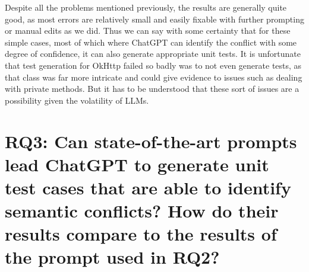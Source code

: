 Despite all the problems mentioned previously, the results are generally quite good, as most errors are relatively small and easily fixable with further prompting or manual edits as we did.
Thus we can say with some certainty that for these simple cases, most of which where ChatGPT can identify the conflict with some degree of confidence, it can also generate appropriate unit tests.
It is unfortunate that test generation for OkHttp failed so badly was to not even generate tests, as that class was far more intricate and could give evidence to issues such as dealing with
private methods. But it has to be understood that these sort of issues are a possibility given the volatility of LLMs.



\section[Research Question 3: Existing prompts]{RQ3: Can state-of-the-art prompts lead ChatGPT to generate
unit test cases that are able to identify semantic conflicts?  How do their
results compare to the results of the prompt used in RQ2?}\label{sec:results:rq3}



